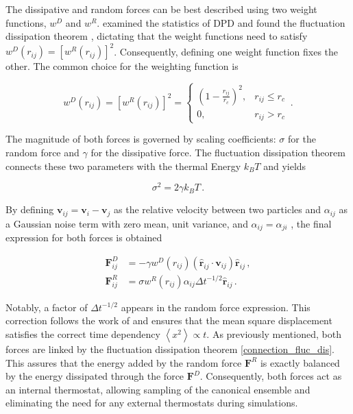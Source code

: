 \documentclass[
    11pt,
    a4paper,
    oneside,        %
    BCOR=10mm,      %
    parskip=half,   %
    listof=nototoc,   %
    bibliography=totoc %
]{scrreprt}
\begin{document}
The dissipative and random forces can be best described using two weight functions, $w^D$ and $w^R$. \citeauthor{Espanol_warren} examined the statistics of DPD and found the fluctuation dissipation theorem \cite{Espanol_warren}, dictating that the weight functions need to satisfy $w^D(r_{ij}) = \left [w^R(r_{ij}) \right ]^2$. Consequently, defining one weight function fixes the other.
The common choice for the weighting function \cite{DPD_groot_warren} is

\begin{equation}
    w^D(r_{ij}) = \left [w^R(r_{ij}) \right ]^2 = \begin{cases}
        \left (1 - \frac{r_{ij}}{r_c} \right )^2, & r_{ij} \leq r_c \\
        0, & r_{ij} > r_c
    \end{cases}\, .
\end{equation}

The magnitude of both forces is governed by scaling coefficients: $\sigma$ for the random force and $\gamma$ for the dissipative force. The fluctuation dissipation theorem connects these two parameters with the thermal Energy $k_B T$ and yields

\begin{equation}
    \sigma^2 = 2 \gamma k_B T\, . \label{connection_fluc_dis}
\end{equation}

By defining $\mathbf{v}_{ij} = \mathbf{v}_i - \mathbf{v}_j$ as the relative velocity between two particles and $\alpha_{ij}$ as a Gaussian noise term with zero mean, unit variance, and $\alpha_{ij} = \alpha_{ji}$ \cite{Espanol_warren}, the final expression for both forces is obtained

\begin{align}
    \mathbf{F}^D_{ij} &= -\gamma w^D(r_{ij})(\hat{\mathbf{r}}_{ij}\cdot \mathbf{v}_{ij})
    \hat{\mathbf{r}}_{ij}\, , \\
    \mathbf{F}^R_{ij} &= \sigma w^R(r_{ij}) \alpha_{ij} \Delta t^{-1/2} \hat{\mathbf{r}}_{ij}\, .
\end{align}

Notably, a factor of $\Delta t^{-1/2}$ appears in the random force expression. This correction follows the work of \citeauthor{DPD_groot_warren} \cite{DPD_groot_warren} and ensures that the mean square displacement satisfies the correct time dependency $\left < x^2\right >\propto t$. As previously mentioned, both forces are linked by the fluctuation dissipation theorem \cref{connection_fluc_dis}. This assures that the energy added by the random force $\mathbf{F}^R$ is exactly balanced by the energy dissipated through the force $\mathbf{F}^D$. Consequently, both forces act as an internal thermostat, allowing sampling of the canonical ensemble and eliminating the need for any external thermostats during simulations.
\end{document}

